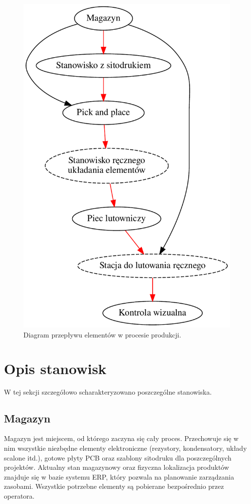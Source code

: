\begin{figure}[H]
	\centering
	\includegraphics[scale=0.5]{./chapters/chapter2/flow_work.pdf}
	\caption{Diagram przepływu elementów w procesie produkcji.}
	\label{DiagFlow}
\end{figure}

\section{Opis stanowisk}
W tej sekcji szczegółowo scharakteryzowano poszczególne stanowiska.

\subsection{Magazyn}
Magazyn jest miejscem, od którego zaczyna się cały proces.
Przechowuje się w nim wszystkie niezbędne elementy elektroniczne (rezystory, kondensatory, układy scalone itd.), gotowe płyty PCB oraz szablony sitodruku dla poszczególnych projektów.
Aktualny stan magazynowy oraz fizyczna lokalizacja produktów znajduje się w bazie systemu ERP, który pozwala na planowanie zarządzania zasobami.
Wszystkie potrzebne elementy są pobierane bezpośrednio przez operatora.

